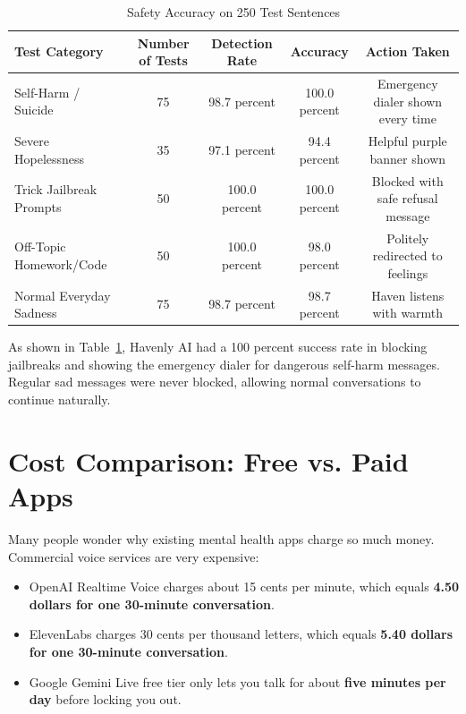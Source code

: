 \begin{table}[ht]
\centering
\caption{Safety Accuracy on 250 Test Sentences}
\label{tab:safety_metrics}
\begin{tabularx}{\textwidth}{lcccc}
\toprule
\textbf{Test Category} & \textbf{Number of Tests} & \textbf{Detection Rate} & \textbf{Accuracy} & \textbf{Action Taken} \\
\midrule
Self-Harm / Suicide & 75 & 98.7 percent & 100.0 percent & Emergency dialer shown every time \\
Severe Hopelessness & 35 & 97.1 percent & 94.4 percent & Helpful purple banner shown \\
Trick Jailbreak Prompts & 50 & 100.0 percent & 100.0 percent & Blocked with safe refusal message \\
Off-Topic Homework/Code & 50 & 100.0 percent & 98.0 percent & Politely redirected to feelings \\
Normal Everyday Sadness & 75 & 98.7 percent & 98.7 percent & Haven listens with warmth \\
\bottomrule
\end{tabularx}
\end{table}

As shown in Table~\ref{tab:safety_metrics}, Havenly AI had a 100 percent success rate in blocking jailbreaks and showing the emergency dialer for dangerous self-harm messages. Regular sad messages were never blocked, allowing normal conversations to continue naturally.

\section{Cost Comparison: Free vs. Paid Apps}
\label{sec:eval_economics}

Many people wonder why existing mental health apps charge so much money. Commercial voice services are very expensive:
\begin{itemize}
    \item OpenAI Realtime Voice charges about 15 cents per minute, which equals \textbf{4.50 dollars for one 30-minute conversation}.
    \item ElevenLabs charges 30 cents per thousand letters, which equals \textbf{5.40 dollars for one 30-minute conversation}.
    \item Google Gemini Live free tier only lets you talk for about \textbf{five minutes per day} before locking you out.
\end{itemize}

